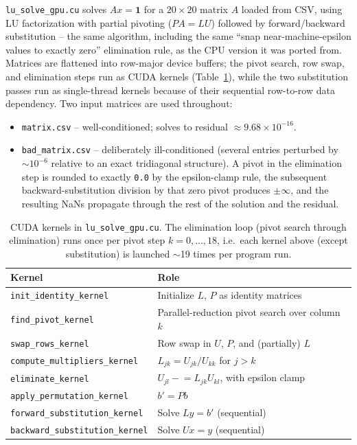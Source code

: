 \documentclass[11pt,a4paper]{article}
\begin{document}
\texttt{lu\_solve\_gpu.cu} solves $Ax = \mathbf{1}$ for a $20\times20$ matrix
$A$ loaded from CSV, using LU factorization with partial pivoting
($PA = LU$) followed by forward/backward substitution -- the same algorithm,
including the same ``snap near-machine-epsilon values to exactly zero''
elimination rule, as the CPU version it was ported from. Matrices are
flattened into row-major device buffers; the pivot search, row swap, and
elimination steps run as CUDA kernels (Table~\ref{tab:kernels}), while the
two substitution passes run as single-thread kernels because of their
sequential row-to-row data dependency. Two input matrices are used
throughout:

\begin{itemize}
  \item \texttt{matrix.csv} -- well-conditioned; solves to residual
    $\approx 9.68\times10^{-16}$.
  \item \texttt{bad\_matrix.csv} -- deliberately ill-conditioned (several
    entries perturbed by $\sim10^{-6}$ relative to an exact tridiagonal
    structure). A pivot in the elimination step is rounded to exactly
    \texttt{0.0} by the epsilon-clamp rule, the subsequent
    backward-substitution division by that zero pivot produces
    $\pm\infty$, and the resulting NaNs propagate through the rest of the
    solution and the residual.
\end{itemize}

\begin{table}[h]
\centering
\begin{tabular}{ll}
\toprule
Kernel & Role \\
\midrule
\texttt{init\_identity\_kernel} & Initialize $L$, $P$ as identity matrices \\
\texttt{find\_pivot\_kernel} & Parallel-reduction pivot search over column $k$ \\
\texttt{swap\_rows\_kernel} & Row swap in $U$, $P$, and (partially) $L$ \\
\texttt{compute\_multipliers\_kernel} & $L_{jk} = U_{jk}/U_{kk}$ for $j > k$ \\
\texttt{eliminate\_kernel} & $U_{jl} \mathrel{-}= L_{jk}U_{kl}$, with epsilon clamp \\
\texttt{apply\_permutation\_kernel} & $b' = Pb$ \\
\texttt{forward\_substitution\_kernel} & Solve $Ly = b'$ (sequential) \\
\texttt{backward\_substitution\_kernel} & Solve $Ux = y$ (sequential) \\
\bottomrule
\end{tabular}
\caption{CUDA kernels in \texttt{lu\_solve\_gpu.cu}. The elimination loop
(pivot search through elimination) runs once per pivot step
$k = 0,\dots,18$, i.e.\ each kernel above (except substitution) is launched
$\sim$19 times per program run.}
\label{tab:kernels}
\end{table}
\end{document}
